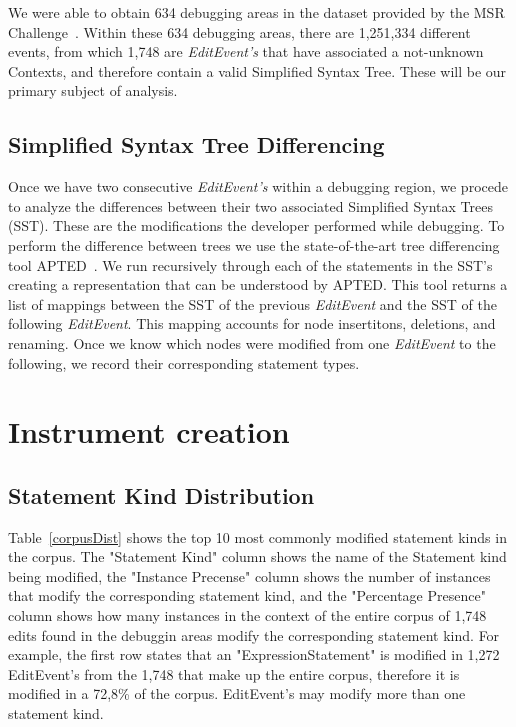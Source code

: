 \documentclass[sigconf]{acmart}
\begin{document}
We were able to obtain 634 debugging areas in the dataset 
provided by the MSR Challenge~\cite{msr18challenge}.
Within these 634 debugging areas, there are 1,251,334
different events, from which 1,748 are \textit{EditEvent's}
that have associated a not-unknown Contexts, and therefore 
contain a valid Simplified Syntax Tree. These will be 
our primary subject of analysis.

\subsection{Simplified Syntax Tree Differencing}
\label{sstDiff}
Once we have two consecutive \textit{EditEvent's} within
a debugging region, we procede to analyze the differences
between their two associated Simplified Syntax Trees (SST).
These are the modifications the developer performed
while debugging.
To perform the difference between trees we use the 
state-of-the-art tree differencing
tool APTED~\cite{Pawlik16Apted}.
We run recursively through each of the statements in the 
SST's creating a representation that can be understood by
APTED. This tool returns a list of mappings between
the SST of the previous \textit{EditEvent} and the SST
of the following \textit{EditEvent}. This mapping
accounts for node insertitons, deletions, and renaming.
Once we know which nodes were modified from one \textit{EditEvent}
to the following, we record their corresponding statement types.

\section{Instrument creation}

\subsection{Statement Kind Distribution}
\label{stmtKindDistribution}
Table~\ref{corpusDist} shows the top 10 most commonly modified 
statement kinds
in the corpus. The "Statement Kind" column shows the name of the 
Statement kind being modified, the "Instance Precense" column
shows the number of instances that modify the corresponding
statement kind, and the "Percentage Presence" column shows 
how many instances in the context of the entire corpus of 
1,748 edits found in the debuggin areas modify the corresponding
statement kind. For example, the first row states that
an "ExpressionStatement" is modified in 1,272 EditEvent's from the
1,748 that make up the entire corpus, therefore  it is modified
in a 72,8\% of the corpus. EditEvent's may modify more than one
statement kind.
\end{document}
